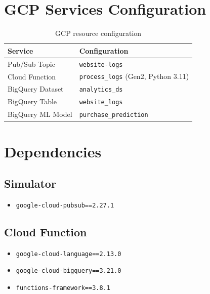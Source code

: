 \documentclass[12pt,a4paper]{article}
\begin{document}
\appendix
\section{GCP Services Configuration}

\begin{table}[H]
\centering
\begin{tabular}{|l|l|}
\hline
\textbf{Service} & \textbf{Configuration} \\
\hline
Pub/Sub Topic & \texttt{website-logs} \\
\hline
Cloud Function & \texttt{process\_logs} (Gen2, Python 3.11) \\
\hline
BigQuery Dataset & \texttt{analytics\_ds} \\
\hline
BigQuery Table & \texttt{website\_logs} \\
\hline
BigQuery ML Model & \texttt{purchase\_prediction} \\
\hline
\end{tabular}
\caption{GCP resource configuration}
\end{table}

\section{Dependencies}

\subsection{Simulator}
\begin{itemize}
    \item \texttt{google-cloud-pubsub==2.27.1}
\end{itemize}

\subsection{Cloud Function}
\begin{itemize}
    \item \texttt{google-cloud-language==2.13.0}
    \item \texttt{google-cloud-bigquery==3.21.0}
    \item \texttt{functions-framework==3.8.1}
\end{itemize}
\end{document}
